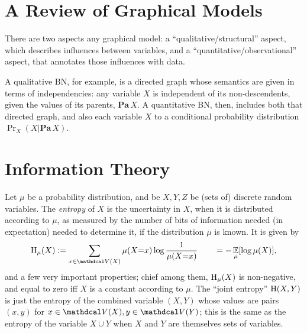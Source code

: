 






\section{A Review of Graphical Models}

There are two aspects any graphical model: 
a ``qualitative/structural'' aspect, which describes influences between variables, and
a ``quantitative/observational'' aspect, 
    that annotates those influences with data.

A qualitative BN, for example, is a directed graph whose semantics are given in terms of independencies: any variable $X$ is independent of its non-descendents, given the values of its parents, $\mathbf{Pa}\, X$.  
A quantitative BN, then, includes both that directed graph, and also each variable $X$ to a conditional probability distribution $\Pr_X(X|\mathbf{Pa}\, X)$.


\section{Information Theory}

Let $\mu$ be a probability distribution, and be $X,Y,Z$
    be (sets of) discrete random variables.
The \emph{entropy} of $X$ is the uncertainty in $X$, when it is distributed according to $\mu$, as measured by the number of bits of information needed (in expectation) needed to determine it, if the distribution $\mu$ is known.  It is given by 
\[
    \H_\mu(X) := \sum_{x \in \V(X)} \mu(X{=}x) \log \frac{1}{\mu(X{=}x)} \qquad= -\Ex_{\mu}[\log \mu(X)],
\]
and a few very important properties; chief among them, $\operatorname{\mathrm{H}}_\mu(X)$ is non-negative, and equal to zero iff $X$ is a constant according to $\mu$. 
The ``joint entropy'' $\operatorname{\mathrm{H}}(X,Y)$ is just the entropy of the combined variable $(X,Y)$ whose values are pairs $(x,y)$ for $x \in \V(X),y \in \V(Y)$; this is the same as the entropy of the variable $X \cup Y$ when $X$ and $Y$ are themselves sets of variables. 

